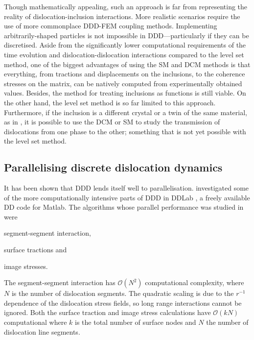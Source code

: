 Though mathematically appealing, such an approach is far from representing the reality of dislocation-inclusion interactions. More realistic scenarios require the use of more commonplace DDD-FEM coupling methods. Implementing arbitrarily-shaped particles is not impossible in DDD---particularly if they can be discretised. Aside from the significantly lower computational requirements of the time evolution and dislocation-dislocation interactions compared to the level set method, one of the biggest advantages of using the SM and DCM methods is that everything, from tractions and displacements on the inclusions, to the coherence stresses on the matrix, can be natively computed from experimentally obtained values. Besides, the method for treating inclusions as functions is still viable. On the other hand, the level set method is so far limited to this approach. Furthermore, if the inclusion is a different crystal or a twin of the same material, as in \cite{twinning}, it is possible to use the DCM or SM to study the transmission of dislocations from one phase to the other; something that is not yet possible with the level set method.

\subsection{Parallelising discrete dislocation dynamics}
\label{ss:parallel_ddd}
It has been shown that DDD lends itself well to parallelisation.  investigated some of the more computationally intensive parts of DDD in DDLab \cite{ddlab}, a freely available DD code for Matlab. The algorithms whose parallel performance was studied in \cite{gpu_ddd} were
\begin{inparaenum}
    \item segment-segment interaction,
    \item surface tractions and
    \item image stresses.
\end{inparaenum}
The segment-segment interaction has $ \mathcal{O}(N^{2}) $ computational complexity, where $ N $ is the number of dislocation segments. The quadratic scaling is due to the $ r^{-1} $ dependence of the dislocation stress fields, so long range interactions cannot be ignored. Both the surface traction and image stress calculations have $ \mathcal{O}(k N) $ computational where $ k $ is the total number of surface nodes and $ N $ the number of dislocation line segments.

